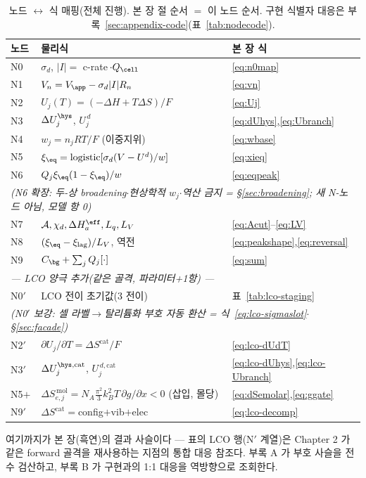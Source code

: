 \begin{table}[t]
\centering
\renewcommand{\arraystretch}{1.3}
\caption{노드 $\leftrightarrow$ 식 매핑(전체 진행). 본 장 절 순서 $=$ 이 노드 순서.
구현 식별자 대응은 부록~\ref{sec:appendix-code}(표~\ref{tab:nodecode}).}
\label{tab:nodemap}
\begin{tabular}{l l l}
\toprule
노드 & 물리식 & 본 장 식 \\
\midrule
N0 & $\sigma_d$, $|I|=$ c-rate$\,\cdot Q_\cell$ & \eqref{eq:n0map} \\
N1 & $V_n=V_\app-\sigma_d|I|R_n$ & \eqref{eq:vn} \\
N2 & $U_j(T)=(-\Delta H+T\Delta S)/F$ & \eqref{eq:Uj} \\
N3 & $\Delta U_j^\hys$, $U_j^{\,d}$ & \eqref{eq:dUhys},\eqref{eq:Ubranch} \\
N4 & $w_j=n_jRT/F$ (이중지위) & \eqref{eq:wbase} \\
N5 & $\xi_\eq=\mathrm{logistic}[\sigma_d(V-U^d)/w]$ & \eqref{eq:xieq} \\
N6 & $Q_j\xi_\eq(1-\xi_\eq)/w$ & \eqref{eq:eqpeak} \\
\multicolumn{3}{l}{\emph{\quad(N6 확장: 두-상 broadening$\cdot$현상학적 $w_j$$\cdot$역산 금지 = \S\ref{sec:broadening}; 새 N-노드 아님, 모델 항 0)}}\\
N7 & $\mathcal A,\chi_d,\Delta H_a^\eff,L_q,L_V$ & \eqref{eq:Acut}--\eqref{eq:LV} \\
N8 & $(\xi_\eq-\xi_\mathrm{lag})/L_V$, 역전 & \eqref{eq:peakshape},\eqref{eq:reversal} \\
N9 & $C_\bg+\sum_jQ_j[\cdot]$ & \eqref{eq:sum} \\
\midrule
\multicolumn{3}{l}{\emph{— LCO 양극 추가(같은 골격, 파라미터+1항) —}}\\
N0$'$ & LCO 전이 초기값(3 전이) & 표~\ref{tab:lco-staging} \\
\multicolumn{3}{l}{\emph{\quad(N0$'$ 보강: 셀 라벨$\to$탈리튬화 부호 자동 환산 = 식~\eqref{eq:lco-sigmaslot}$\cdot$\S\ref{sec:facade})}}\\
N2$'$ & $\partial U_j/\partial T=\Delta S^\mathrm{cat}/F$ & \eqref{eq:lco-dUdT} \\
N3$'$ & $\Delta U_j^{\hys,\mathrm{cat}}$, $U_j^{\,d,\mathrm{cat}}$ & \eqref{eq:lco-dUhys},\eqref{eq:lco-Ubranch} \\
N5$+$ & $\Delta S_{e,j}^{\,\mathrm{mol}}=N_A\tfrac{\pi^2}{3}k_B^2T\,\partial g/\partial x<0$ (삽입, 몰당) & \eqref{eq:dSemolar},\eqref{eq:ggate} \\
N9$'$ & $\Delta S^\mathrm{cat}=$config$+$vib$+$elec & \eqref{eq:lco-decomp} \\
\bottomrule
\end{tabular}
\end{table}

여기까지가 본 장(흑연)의 결과 사슬이다 --- 표의 LCO 행(N$'$ 계열)은 Chapter 2 가 같은 forward 골격을
재사용하는 지점의 통합 대응 참조다. 부록 A 가 부호 사슬을
전수 검산하고, 부록 B 가 구현과의 1:1 대응을 역방향으로 조회한다.

